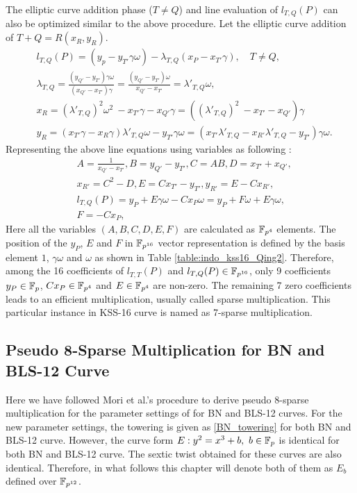 The elliptic curve addition phase \texorpdfstring{($T\neq Q$)}{} and line evaluation of $ l_{T,Q}(P)$ can also be optimized similar to the above procedure. Let the elliptic curve addition of $T+Q = R(x_R, y_R)$.
\begin{eqnarray}
&  l_{T,Q}(P) = (y_p-y_{T'} \gamma \omega)- \lambda_{T,Q}(x_P-x_{T'}\gamma),  \quad \text{$T \neq Q$,} \nonumber \\
&\lambda_{T,Q}= \frac{( y_{Q'}-y_{T'})\gamma \omega}{( x_{Q'}-x_{T'})\gamma} = \frac{( y_{Q'}-y_{T'}) \omega}{x_{Q'}-x_{T'}} = \lambda'_{T,Q} \omega, \nonumber\\
& x_{R} = (\lambda'_{T,Q})^2 \omega^2 \ - x_{T'}\gamma -  x_{Q'}\gamma = ((\lambda'_{T,Q})^2  \ - x_{T'} -x_{Q'})\gamma \nonumber \\
 & y_{R}= (x_{T'} \gamma-x_{R} \gamma)\lambda'_{T,Q} \omega-y_{T'}\gamma\omega = (x_{T'}\lambda'_{T,Q} -x_{R'}\lambda'_{T,Q}-y_{T'})\gamma \omega \nonumber.
\end{eqnarray}
Representing the above line equations using variables as following :
\begin{eqnarray}
&A=\frac{1}{x_{Q'}-x_{T'}}, B=y_{Q'}-y_{T'}, C=AB, D=x_{T'}+x_{Q'},\nonumber\\
 & x_{R'}=C^2-D, E= Cx_{T'}-y_{T'}, y_{R'}=E-Cx_{R'},\nonumber\\
&l_{T,Q}(P)= y_P+E \gamma \omega-Cx_P\omega = y_P+F\omega+E \gamma \omega, \label{indo_kss16_sparse_add}\\
 & F=-Cx_P,  \nonumber
\end{eqnarray}
Here all the variables $(A,B,C, D, E, F)$  are calculated as $\mathbb{F}_{p^4}$ elements.
The  position of the $y_P$, $E$ and $F$ in $\mathbb{F}_{p^{16}}$ vector representation is defined by the basis element $1$, $\gamma\omega $ and $\omega$ as shown in Table \ref{table:indo_kss16_Qing2}. 
Therefore,  among the 16 coefficients of  $l_{T,T}(P)$ and $l_{T,Q}(P)\in \mathbb{F}_{p^{16}}$, only 9 coefficients $y_P\in {\mathbb{F}}_{p}$, $Cx_P\in \mathbb{F}_{p^4}$ and $E\in \mathbb{F}_{p^4}$ are  non-zero. The remaining 7 zero coefficients leads to an efficient multiplication, usually called sparse multiplication. This particular instance in KSS-16 curve is named as 7-sparse multiplication.


\subsection{Pseudo 8-Sparse Multiplication for BN and BLS-12 Curve}  
Here we have followed Mori et al.'s \cite{PAIRING:MANS13} procedure to derive pseudo 8-sparse multiplication for the parameter settings of \cite{EPRINT:BarDuq17} for BN and BLS-12 curves. 
For the new parameter settings, the towering is given as \eqref{BN_towering} for both BN and BLS-12 curve.
However, the curve form $E:y^2=x^3+b, ~b \in {\mathbb{F}}_{p}$ is identical for both BN and BLS-12 curve.
The sextic twist obtained for these curves are also identical.
Therefore, in what follows this chapter will denote both of them as $E_b$ defined over $\mathbb{F}_{p^{12}}$.

